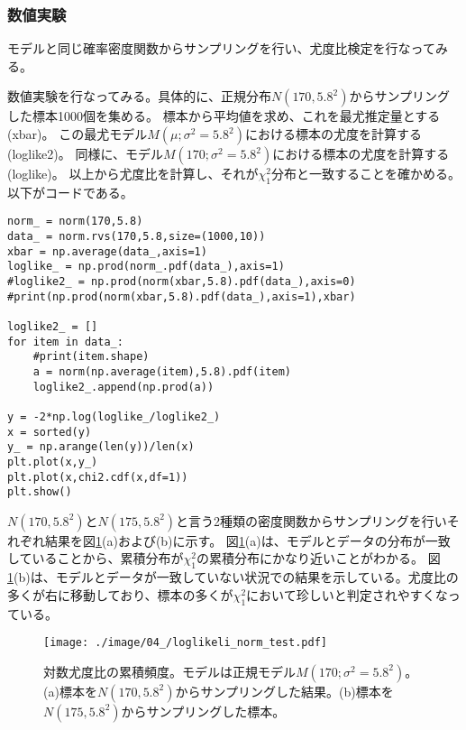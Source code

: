 \subsubsection{数値実験}
モデルと同じ確率密度関数からサンプリングを行い、尤度比検定を行なってみる。

数値実験を行なってみる。具体的に、正規分布$N(170,5.8^2)$からサンプリングした標本1000個を集める。
標本から平均値を求め、これを最尤推定量とする(xbar)。
この最尤モデル$M(\mu;\sigma^2=5.8^2) $における標本の尤度を計算する(loglike2)。
同様に、モデル$M(170;\sigma^2=5.8^2)$における標本の尤度を計算する(loglike)。
以上から尤度比を計算し、それが$\chi^2_1$分布と一致することを確かめる。
以下がコードである。

\begin{lstlisting}
norm_ = norm(170,5.8)
data_ = norm.rvs(170,5.8,size=(1000,10))
xbar = np.average(data_,axis=1)
loglike_ = np.prod(norm_.pdf(data_),axis=1)
#loglike2_ = np.prod(norm(xbar,5.8).pdf(data_),axis=0)
#print(np.prod(norm(xbar,5.8).pdf(data_),axis=1),xbar)

loglike2_ = []
for item in data_:
    #print(item.shape)
    a = norm(np.average(item),5.8).pdf(item)
    loglike2_.append(np.prod(a))

y = -2*np.log(loglike_/loglike2_)
x = sorted(y)
y_ = np.arange(len(y))/len(x)
plt.plot(x,y_)
plt.plot(x,chi2.cdf(x,df=1))
plt.show()

\end{lstlisting}

$N(170,5.8^2)$と$N(175,5.8^2)$と言う2種類の密度関数からサンプリングを行いそれぞれ結果を図\ref{fig:loglikelihood_test_simulation_norm}(a)および(b)に示す。
図\ref{fig:loglikelihood_test_simulation_norm}(a)は、モデルとデータの分布が一致していることから、累積分布が$\chi^2_1$の累積分布にかなり近いことがわかる。
図\ref{fig:loglikelihood_test_simulation_norm}(b)は、モデルとデータが一致していない状況での結果を示している。尤度比の多くが右に移動しており、標本の多くが$\chi^2_1$において珍しいと判定されやすくなっている。


\begin{figure}
    \begin{center}
        \texttt{[image: ./image/04\_/loglikeli\_norm\_test.pdf]}
        \caption{対数尤度比の累積頻度。モデルは正規モデル$M(170;\sigma^2=5.8^2)$。(a)標本を$N(170,5.8^2)$からサンプリングした結果。(b)標本を$N(175,5.8^2)$からサンプリングした標本。}
        \label{fig:loglikelihood_test_simulation_norm}

      \end{center}
    \end{figure}

